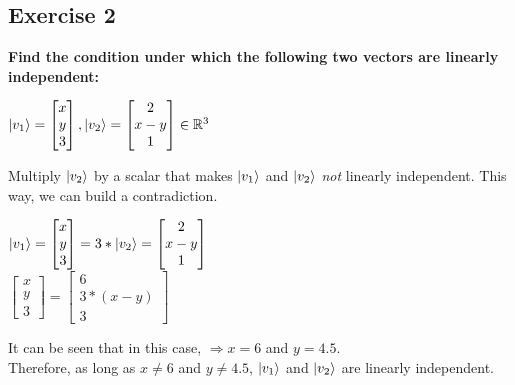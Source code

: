 \documentclass[12pt]{article}
\theoremstyle{plain}
\theoremstyle{nonumberplain}
\theoremstyle{plain}
\theoremstyle{nonumberplain}
\newcommand\1{{\bf 1}}
\newcommand{\bmat}[1]{\begin{bmatrix*} #1 \end{bmatrix*}} %
\newcommand{\R}{\mathbb{R}} %
\newcommand{\<}{\left\langle}
\renewcommand{\>}{\right\rangle}
\begin{document}

\subsection{Exercise 2}
\textbf{Find the condition under which the following two vectors are linearly independent:}
\begin{center}
$\ket{v_1}=\bmat{x \\ y \\ 3},\ket{v_2}=\bmat{2 \\ x-y \\ 1}\in\R^3$
\end{center}
Multiply $\ket{v_2}$ by a scalar that makes $\ket{v_1}$ and $\ket{v_2}$ \textit{not} linearly independent. This way, we can build a contradiction.
\begin{center}
$\ket{v_1}=\bmat{x \\ y \\ 3} = 3*\ket{v_2}=\bmat{2 \\ x-y \\ 1}$ \\
$\bmat{x \\ y \\ 3}=\bmat{6 \\ 3*(x-y) \\ 3}$
\end{center}
It can be seen that in this case, $\Longrightarrow x=6$ and $y=4.5$. \\
Therefore, as long as $x\neq6$ and $y\neq4.5$, $\ket{v_1}$ and $\ket{v_2}$ are linearly independent.

\end{document}

